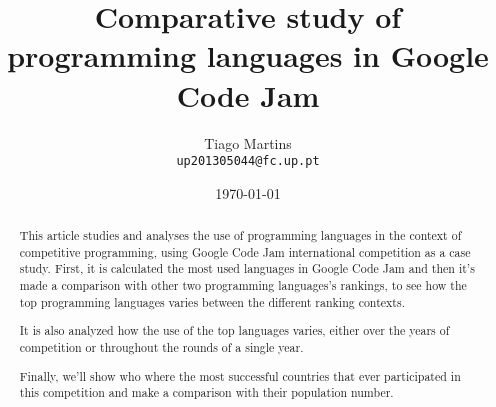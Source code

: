 \documentclass{article}
\begin{document}
\title{Comparative study of programming languages in Google Code Jam}

\author{Tiago Martins\\ \texttt{up201305044@fc.up.pt} \\
}

\date{\today}

\maketitle


\begin{abstract}

This article studies and analyses the use of programming languages in the context of competitive programming, using Google Code Jam international competition as a case study. First, it is calculated the most used languages in Google Code Jam and then it's made a comparison with other two programming languages's rankings, to see how the top programming languages varies between the different ranking contexts.

It is also analyzed how the use of the top languages varies, either over the years of competition or throughout the rounds of a single year.

Finally, we'll show who where the most successful countries that ever participated in this competition and make a comparison with their population number.


\vspace{5mm}
\end{abstract}

\end{document}
